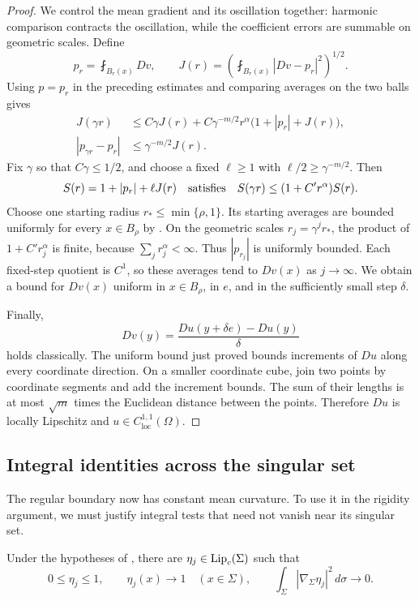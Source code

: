\begin{proof}
We control the mean gradient and its oscillation together: harmonic
comparison contracts the oscillation, while the coefficient errors
are summable on geometric scales. Define
\[
 p_r=\fint_{B_r(x)}Dv,
 \qquad
 J(r)=\left(\fint_{B_r(x)}|Dv-p_r|^2\right)^{1/2}.
\]
Using $p=p_r$ in the preceding estimates and comparing averages on
the two balls gives
\begin{align}
\label{eq:equality-oscillation-iteration}
 J(\gamma r)
 &\le C\gamma J(r)
   +C\gamma^{-m/2}r^\alpha\bigl(1+|p_r|+J(r)\bigr),\\
\label{eq:equality-mean-iteration}
 |p_{\gamma r}-p_r|&\le\gamma^{-m/2}J(r).
\end{align}
Fix $\gamma$ so that $C\gamma\le1/2$, and choose a fixed
$\ell\ge1$ with $\ell/2\ge\gamma^{-m/2}$. Then
\[
 S(r)=1+|p_r|+\ell J(r)
 \quad\hbox{satisfies}\quad
 S(\gamma r)\le(1+C'r^\alpha)S(r).
\]
Choose one starting radius $r_*\le\min\{\rho,1\}$. Its starting
averages are bounded uniformly for every $x\in B_\rho$ by
. On the geometric scales
$r_j=\gamma^jr_*$, the product of $1+C'r_j^\alpha$ is finite,
because $\sum_jr_j^\alpha<\infty$. Thus $|p_{r_j}|$ is uniformly
bounded. Each fixed-step quotient is $C^1$, so these averages tend
to $Dv(x)$ as $j\to\infty$. We obtain a bound for $Dv(x)$ uniform
in $x\in B_\rho$, in $e$, and in the sufficiently small step
$\delta$.

Finally,
\[
 Dv(y)=\frac{Du(y+\delta e)-Du(y)}{\delta}
\]
holds classically. The uniform bound just proved bounds increments
of $Du$ along every coordinate direction. On a smaller coordinate
cube, join two points by coordinate segments and add the increment
bounds. The sum of their lengths is at most $\sqrt m$ times the
Euclidean distance between the points. Therefore $Du$ is locally
Lipschitz and $u\in C^{1,1}_{\mathrm{loc}}(\Omega)$.
\end{proof}

\subsection{Integral identities across the singular set}

The regular boundary now has constant mean curvature. To use it in
the rigidity argument, we must justify integral tests that need not
vanish near its singular set.

\begin{lemma}
\label{lem:equality-cutoffs}
Under the hypotheses of , there are
$\eta_j\in\operatorname{Lip}_c(\Sigma)$ such that
\[
 0\le\eta_j\le1,
 \qquad \eta_j(x)\longrightarrow1\quad(x\in\Sigma),
 \qquad
 \int_\Sigma|\nabla_\Sigma\eta_j|^2\,d\sigma\longrightarrow0.
\]
\end{lemma}

